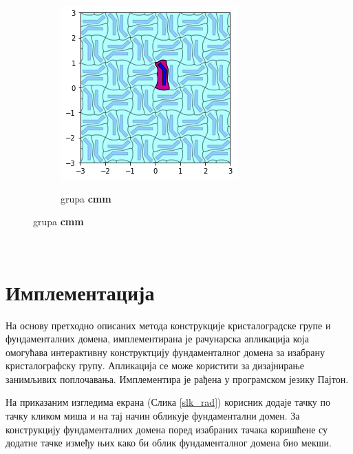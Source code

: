 \documentclass[12pt]{report}
\begin{document}
\begin{samepage}
\begin{figure}[H]
\begin{subfigure}[b]{0.3\textwidth}
  \end{subfigure}
  \begin{subfigure}[b]{0.3\textwidth}
    \includegraphics[width=\textwidth]{output_21_7.png}
    \label{fig:f25}
    \caption{grupa \textbf{cmm}}
  \end{subfigure}
\end{figure}
\end{samepage}

\quad \\ \qquad
    \chapter{Имплементација}\label{implementacija}

На основу претходно описаних метода конструкције кристалоградске групе и фундаменталних домена, имплементирана је рачунарска апликација која омогућава интерактивну конструктцију фундаменталног домена за изабрану кристалографску групу.
Апликација се може користити за дизајнирање занимљивих поплочавања.
Имплементира је рађена у програмском језику Пајтон.

На приказаним изгледима екрана (Слика \ref{slk_rad}) корисник додаје тачку по тачку кликом миша и на тај начин обликује фундаментални домен. За конструкцију фундаменталних домена поред изабраних тачака коришћене су додатне тачке између њих како би облик фундаменталног домена био мекши. 
\end{document}
